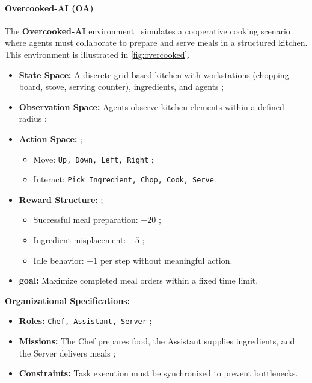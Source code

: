 \documentclass[pdflatex,sn-mathphys-num]{sn-jnl}%
\theoremstyle{thmstyleone}%
\theoremstyle{thmstyletwo}%
\theoremstyle{thmstylethree}%
\begin{document}
\paragraph{Overcooked-AI (OA)}
The \textbf{Overcooked-AI} environment~\cite{overcookedai} simulates a cooperative cooking scenario where agents must collaborate to prepare and serve meals in a structured kitchen. This environment is illustrated in \autoref{fig:overcooked}.

\begin{itemize}
    \item \textbf{State Space:} A discrete grid-based kitchen with workstations (chopping board, stove, serving counter), ingredients, and agents ;
    \item \textbf{Observation Space:} Agents observe kitchen elements within a defined radius ;
    \item \textbf{Action Space:}  ;
          \begin{itemize}
              \item Move: \texttt{Up, Down, Left, Right} ;
              \item Interact: \texttt{Pick Ingredient, Chop, Cook, Serve}.
          \end{itemize}
    \item \textbf{Reward Structure:} ;
          \begin{itemize}
              \item Successful meal preparation: $+20$ ;
              \item Ingredient misplacement: $-5$ ;
              \item Idle behavior: $-1$ per step without meaningful action.
          \end{itemize}
    \item \textbf{goal:} Maximize completed meal orders within a fixed time limit.
\end{itemize}

\textbf{Organizational Specifications:}
\begin{itemize}
    \item \textbf{Roles:} \texttt{Chef, Assistant, Server} ;
    \item \textbf{Missions:} The Chef prepares food, the Assistant supplies ingredients, and the Server delivers meals ;
    \item \textbf{Constraints:} Task execution must be synchronized to prevent bottlenecks.
\end{itemize}
\end{document}
